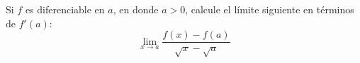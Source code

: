 \item Si $f$ es diferenciable en $a$, en donde $a > 0$, calcule el límite siguiente en términos de $f'(a)$:
$$\lim_{x \to a} \frac{f(x) - f(a)}{\sqrt{x} - \sqrt{a}}$$
